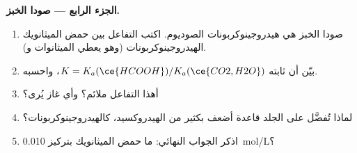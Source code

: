 \begin{problem}
\medskip
\noindent\textbf{الجزء الرابع --- صودا الخبز.}
\begin{enumerate}[resume]
  \item صودا الخبز هي هيدروجينوكربونات الصوديوم. اكتب التفاعل
        بين حمض الميثانويك  الهيدروجينوكربونات (وهو يعطي
        الميثانوات و).
  \item بيّن أن ثابته $K = K_a(\ce{HCOOH}) / K_a(\ce{CO2,H2O})$،
        واحسبه.
  \item أهذا التفاعل ملائم؟ وأي غاز يُرى؟
  \item لماذا تُفضَّل على الجلد قاعدة أضعف بكثير من الهيدروكسيد، كالهيدروجينوكربونات؟
  \item اذكر الجواب النهائي: ما   حمض الميثانويك
        بتركيز \qty{0.010}{mol/L}؟
\end{enumerate}
\end{problem}
